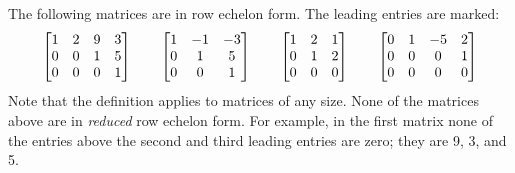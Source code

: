 \documentclass{ximera}
\begin{document}
\begin{example}
    The following matrices are in row echelon form.  The leading entries are marked:
    \begin{equation*}
        \begin{bmatrix}
            1 & 2 & 9 & 3 \\
            0 & 0 & 1 & 5 \\
            0 & 0 & 0 & 1
        \end{bmatrix}
        \qquad
        \begin{bmatrix}
            1 & -1 & -3  \\
            0 & 1 & 5  \\
            0 & 0 & 1
        \end{bmatrix}
        \qquad
        \begin{bmatrix}
            1 & 2 & 1 \\
            0 & 1 & 2 \\
            0 & 0 & 0
        \end{bmatrix}
        \qquad
        \begin{bmatrix}
            0 & 1 & -5 & 2 \\
            0 & 0 & 0 & 1 \\
            0 & 0 & 0 & 0
        \end{bmatrix}
    \end{equation*}
    Note that the definition applies to matrices of any size. None of the matrices above are in \emph{reduced} row echelon form.  For example, in the first matrix none of the entries above the second and third leading entries are zero; they are 9, 3, and 5.
    

\end{example}
\end{document}
